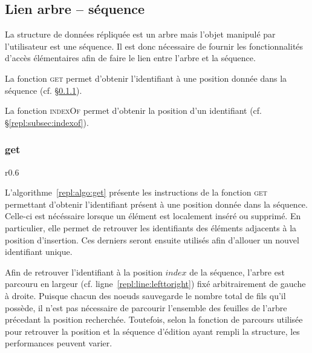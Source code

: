 \subsection{Lien arbre -- séquence}

La structure de données répliquée est un arbre mais l'objet manipulé par
l'utilisateur est une séquence. Il est donc nécessaire de fournir les
fonctionnalités d'accès élémentaires afin de faire le lien entre l'arbre et la
séquence.
\begin{inparaenum}[(i)]
\item La fonction \textsc{get} permet d'obtenir l'identifiant à une position
  donnée dans la séquence (cf. §\ref{repl:subsec:get}).
\item La fonction \textsc{indexOf} permet d'obtenir la position d'un
  identifiant (cf. §\ref{repl:subsec:indexof}).
\end{inparaenum}

\subsubsection{get}
\label{repl:subsec:get}

\begin{wrapfigure}{r}{0.6\textwidth}
  \vspace{-35pt} %
  \begin{minipage}[t]{0.6\textwidth}
    \begin{algorithm}[H]
      
      \caption{\label{repl:algo:get} Get.}
    \end{algorithm}
  \end{minipage}
  \vspace{-15pt}
\end{wrapfigure}

L'algorithme~\ref{repl:algo:get} présente les instructions de la fonction
\textsc{get} permettant d'obtenir l'identifiant présent à une position donnée
dans la séquence. Celle-ci est nécéssaire lorsque un élément est localement
inséré ou supprimé. En particulier, elle permet de retrouver les identifiants
des éléments adjacents à la position d'insertion. Ces derniers seront ensuite
utilisés afin d'allouer un nouvel identifiant unique.

Afin de retrouver l'identifiant à la position $index$ de la séquence, l'arbre
est parcouru en largeur (cf. ligne~\ref{repl:line:lefttoright}) fixé
arbitrairement de gauche à droite.  Puisque chacun des noeuds sauvegarde le
nombre total de fils qu'il possède, il n'est pas nécessaire de parcourir
l'ensemble des feuilles de l'arbre précedant la position recherchée. Toutefois,
selon la fonction de parcours utilisée pour retrouver la position et la séquence
d'édition ayant rempli la structure, les performances peuvent varier.

